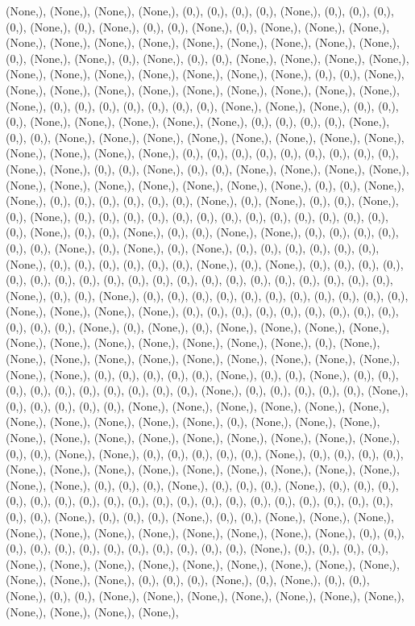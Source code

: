 \documentclass{article}
\begin{document}
(None,), (None,), (None,), (None,), (0,), (0,), (0,), (0,), (None,), (0,), (0,), (0,), (0,), (None,), (0,), (None,), (0,), (0,), (None,), (0,), (None,), (None,), (None,), (None,), (None,), (None,), (None,), (None,), (None,), (None,), (None,), (None,), (0,), (None,), (None,), (0,), (None,), (0,), (0,), (None,), (None,), (None,), (None,), (None,), (None,), (None,), (None,), (None,), (None,), (None,), (0,), (0,), (None,), (None,), (None,), (None,), (None,), (None,), (None,), (None,), (None,), (None,), (None,), (0,), (0,), (0,), (0,), (0,), (0,), (0,), (None,), (None,), (None,), (0,), (0,), (0,), (None,), (None,), (None,), (None,), (None,), (0,), (0,), (0,), (0,), (None,), (0,), (0,), (None,), (None,), (None,), (None,), (None,), (None,), (None,), (None,), (None,), (None,), (None,), (None,), (0,), (0,), (0,), (0,), (0,), (0,), (0,), (0,), (0,), (None,), (None,), (0,), (0,), (None,), (0,), (0,), (None,), (None,), (None,), (None,), (None,), (None,), (None,), (None,), (None,), (None,), (None,), (0,), (0,), (None,), (None,), (0,), (0,), (0,), (0,), (0,), (0,), (None,), (0,), (None,), (0,), (0,), (None,), (0,), (None,), (0,), (0,), (0,), (0,), (0,), (0,), (0,), (0,), (0,), (0,), (0,), (0,), (0,), (0,), (None,), (0,), (0,), (None,), (0,), (0,), (None,), (None,), (0,), (0,), (0,), (0,), (0,), (0,), (None,), (0,), (None,), (0,), (None,), (0,), (0,), (0,), (0,), (0,), (0,), (None,), (0,), (0,), (0,), (0,), (0,), (0,), (None,), (0,), (None,), (0,), (0,), (0,), (0,), (0,), (0,), (0,), (0,), (0,), (0,), (0,), (0,), (0,), (0,), (0,), (0,), (0,), (0,), (0,), (0,), (None,), (0,), (0,), (None,), (0,), (0,), (0,), (0,), (0,), (0,), (0,), (0,), (0,), (0,), (0,), (None,), (None,), (None,), (None,), (0,), (0,), (0,), (0,), (0,), (0,), (0,), (0,), (0,), (0,), (0,), (0,), (None,), (0,), (None,), (0,), (None,), (None,), (None,), (None,), (None,), (None,), (None,), (None,), (None,), (None,), (None,), (0,), (None,), (None,), (None,), (None,), (None,), (None,), (None,), (None,), (None,), (None,), (None,), (None,), (0,), (0,), (0,), (0,), (0,), (None,), (0,), (0,), (None,), (0,), (0,), (0,), (0,), (0,), (0,), (0,), (0,), (0,), (0,), (None,), (0,), (0,), (0,), (0,), (0,), (None,), (0,), (0,), (0,), (0,), (0,), (None,), (None,), (None,), (None,), (None,), (None,), (None,), (None,), (None,), (None,), (None,), (0,), (None,), (None,), (None,), (None,), (None,), (None,), (None,), (None,), (None,), (None,), (None,), (None,), (0,), (0,), (None,), (None,), (0,), (0,), (0,), (0,), (0,), (None,), (0,), (0,), (0,), (0,), (None,), (None,), (None,), (None,), (None,), (None,), (None,), (None,), (None,), (None,), (None,), (0,), (0,), (0,), (None,), (0,), (0,), (0,), (None,), (0,), (0,), (0,), (0,), (0,), (0,), (0,), (0,), (0,), (0,), (0,), (0,), (0,), (0,), (0,), (0,), (0,), (0,), (0,), (0,), (0,), (None,), (0,), (0,), (0,), (None,), (0,), (0,), (None,), (None,), (None,), (None,), (None,), (None,), (None,), (None,), (None,), (None,), (None,), (0,), (0,), (0,), (0,), (0,), (0,), (0,), (0,), (0,), (0,), (0,), (0,), (None,), (0,), (0,), (0,), (0,), (None,), (None,), (None,), (None,), (None,), (None,), (None,), (None,), (None,), (None,), (None,), (None,), (0,), (0,), (0,), (None,), (0,), (None,), (0,), (0,), (None,), (0,), (0,), (None,), (None,), (None,), (None,), (None,), (None,), (None,), (None,), (None,), (None,), (None,), 
\end{document}

